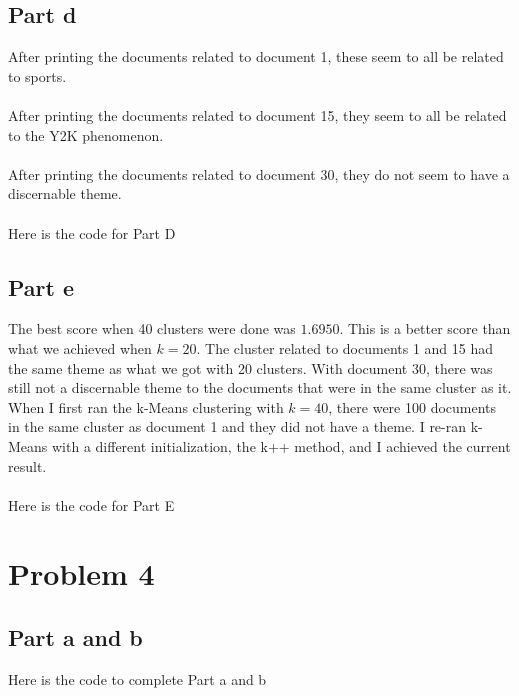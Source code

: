 \documentclass[twoside,11pt]{article}
\theoremstyle{definition}
\begin{document}
\newpage

\subsection*{Part d}

After printing the documents related to document 1, these seem to all be related to sports. \\
\\
After printing the documents related to document 15, they seem to all be related to the Y2K phenomenon. \\
\\
After printing the documents related to document 30, they do not seem to have a discernable theme. \\
\\
Here is the code for Part D\\

\newpage
\subsection*{Part e}

The best score when 40 clusters were done was $1.6950$. This is a better score than what we achieved when $k=20$. The cluster related to documents 1 and 15 had the same theme as what we got with 20 clusters. With document 30, there was still not a discernable theme to the documents that were in the same cluster as it. When I first ran the k-Means clustering with $k=40$, there were 100 documents in the same cluster as document 1 and they did not have a theme. I re-ran k-Means with a different initialization, the k++ method, and I achieved the current result. \\
\\
Here is the code for Part E\\


\newpage

\section*{Problem 4}

\subsection*{Part a and b}

Here is the code to complete Part a and b

\end{document}
